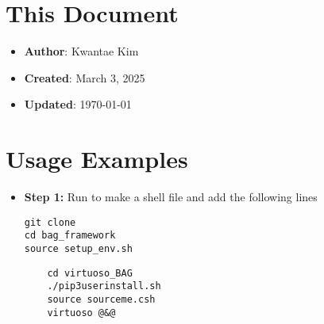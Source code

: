 \documentclass[a4paper,12pt]{article}
\begin{document}
\section{This Document}

\begin{itemize}
    \item \textbf{Author}: Kwantae Kim
    \item \textbf{Created}: March 3, 2025
    \item \textbf{Updated}: \today
\end{itemize}

\pagebreak


\section{Usage Examples}

\begin{itemize}
    \item[\footnotesize\faCode] \textbf{Step 1:} Run  to make a shell file and add the following lines
          \vspace{-1em}\begin{verbatim}
git clone
cd bag_framework
source setup_env.sh
        \end{verbatim}
          \vspace{-1em}\begin{verbatim}
    cd virtuoso_BAG
    ./pip3userinstall.sh
    source sourceme.csh
    virtuoso @&@
        \end{verbatim}
\end{itemize}


\label{lastpage}
\end{document}
